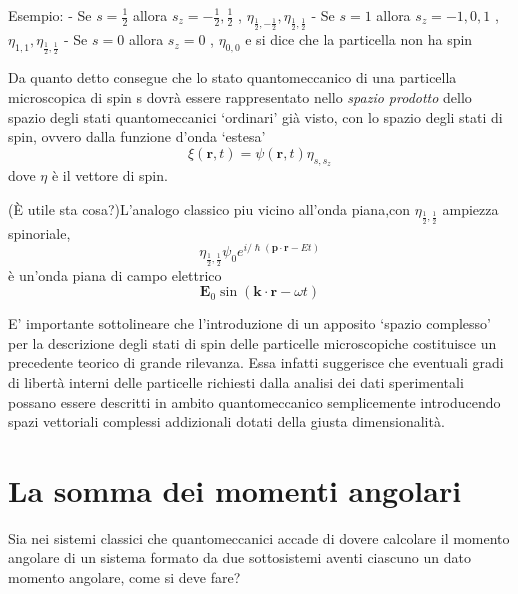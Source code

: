 Esempio: - Se \(s = \frac{1}{2}\) allora
\(s_{z} = - \frac{1}{2} , \frac{1}{2}\) ,
\(\eta_{\frac{1}{2},- \frac{1}{2}}, \eta_{\frac{1}{2}, \frac{1}{2}}\) -
Se \(s = 1\) allora \(s_{z} = -1,0,1\) ,
\(\eta_{1,1},\eta_{\frac{1}{2}, \frac{1}{2}}\) - Se \(s = 0\) allora
\(s_{z} = 0\) , \(\eta_{0,0}\) e si dice che la particella non ha spin

Da quanto detto consegue che lo stato quantomeccanico di una particella
microscopica di spin s dovrà essere rappresentato nello \emph{spazio
prodotto} dello spazio degli stati quantomeccanici `ordinari' già visto,
con lo spazio degli stati di spin, ovvero dalla funzione d'onda `estesa'
\[
    \xi(\bm{r},t) =   \psi(\bm{r},t) \eta_{s,s_{z}}
\] dove \(\eta\) è il vettore di spin.

(È utile sta cosa?)L'analogo classico piu vicino all'onda piana,con
\(\eta_{\frac{1}{2}, \frac{1}{2}}\) ampiezza spinoriale, \[
                                                             \eta_{\frac{1}{2}, \frac{1}{2}} \psi_{0}e^{ i/\hslash (\bm{p}\cdot \bm{r} - Et)}
\] è un'onda piana di campo elettrico \[
                                          \bm{E}_{0} \sin(\bm{k}\cdot \bm{r} - \omega t)
\]

E' importante sottolineare che l'introduzione di un apposito `spazio
complesso' per la descrizione degli stati di spin delle particelle
microscopiche costituisce un precedente teorico di grande rilevanza.
Essa infatti suggerisce che eventuali gradi di libertà interni delle
particelle richiesti dalla analisi dei dati sperimentali possano essere
descritti in ambito quantomeccanico semplicemente introducendo spazi
vettoriali complessi addizionali dotati della giusta dimensionalità.

\section{La somma dei momenti angolari}\label{sec:somma-dei-momenti-angolari}

Sia nei sistemi classici che quantomeccanici accade di dovere calcolare
il momento angolare di un sistema formato da due sottosistemi aventi
ciascuno un dato momento angolare, come si deve fare?

